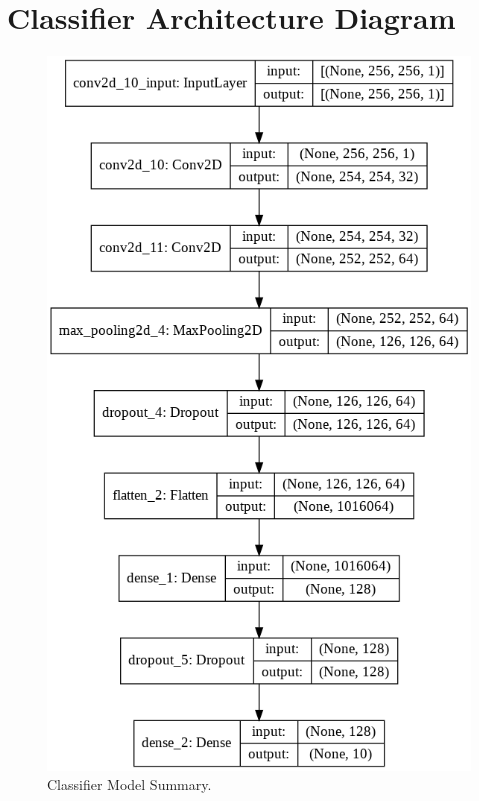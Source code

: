 \section{Classifier Architecture Diagram}
\begin{figure}[H]
        \vspace*{3cm}
	    \begin{center} 
	    \includegraphics[scale=0.45]{images/Appendix/ClassifierModelSummary.png}
	     \caption{Classifier Model Summary.}
	     \label{fig:ClassifierModelSummary}
	    \end{center}
\end{figure}


